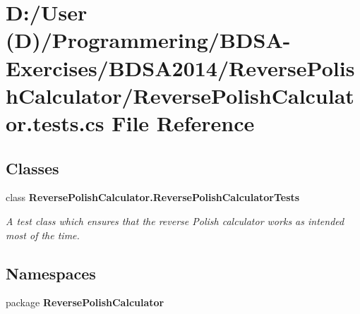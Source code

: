 \section{D\+:/\+User (D)/\+Programmering/\+B\+D\+S\+A-\/\+Exercises/\+B\+D\+S\+A2014/\+Reverse\+Polish\+Calculator/\+Reverse\+Polish\+Calculator.tests.\+cs File Reference}
\label{_reverse_polish_calculator_8tests_8cs}
\subsection*{Classes}
\begin{DoxyCompactItemize}
\item 
class {\bf Reverse\+Polish\+Calculator.\+Reverse\+Polish\+Calculator\+Tests}
\begin{DoxyCompactList}\small\item\em A test class which ensures that the reverse Polish calculator works as intended most of the time. \end{DoxyCompactList}\end{DoxyCompactItemize}
\subsection*{Namespaces}
\begin{DoxyCompactItemize}
\item 
package {\bf Reverse\+Polish\+Calculator}
\end{DoxyCompactItemize}
